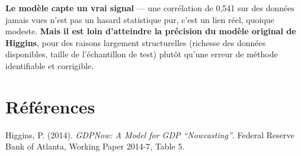 \documentclass[11pt,a4paper]{article}
\begin{document}
\begin{resultatbox}
\textbf{Le modèle capte un vrai signal} --- une corrélation de 0,541 sur des données jamais vues n'est pas un hasard statistique pur, c'est un lien réel, quoique modeste. \textbf{Mais il est loin d'atteindre la précision du modèle original de Higgins}, pour des raisons largement structurelles (richesse des données disponibles, taille de l'échantillon de test) plutôt qu'une erreur de méthode identifiable et corrigible.
\end{resultatbox}

\section*{Références}
\begin{enumerate}[leftmargin=1.6em, label=\textbf{[\arabic*]}]
\item \hypertarget{ref1}{} Higgins, P. (2014). \textit{GDPNow: A Model for GDP ``Nowcasting''}. Federal Reserve Bank of Atlanta, Working Paper 2014-7, Table 5.
\end{enumerate}
\end{document}
